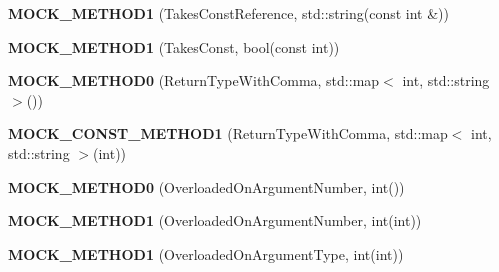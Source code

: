 \begin{DoxyCompactItemize}
{\bfseries M\+O\+C\+K\+\_\+\+M\+E\+T\+H\+O\+D1} (Takes\+Const\+Reference, std\+::string(const int \&))
\item 
\mbox{\label{classtesting_1_1gmock__function__mocker__test_1_1LegacyMockFoo_ab1757ec948df353ac259b0e37752f4c8}} 
{\bfseries M\+O\+C\+K\+\_\+\+M\+E\+T\+H\+O\+D1} (Takes\+Const, bool(const int))
\item 
\mbox{\label{classtesting_1_1gmock__function__mocker__test_1_1LegacyMockFoo_a9173d8a2a77921ea32a74d27ef425a8f}} 
{\bfseries M\+O\+C\+K\+\_\+\+M\+E\+T\+H\+O\+D0} (Return\+Type\+With\+Comma, std\+::map$<$ int, std\+::string $>$())
\item 
\mbox{\label{classtesting_1_1gmock__function__mocker__test_1_1LegacyMockFoo_acc5444194616f279908cc27fc1ad3042}} 
{\bfseries M\+O\+C\+K\+\_\+\+C\+O\+N\+S\+T\+\_\+\+M\+E\+T\+H\+O\+D1} (Return\+Type\+With\+Comma, std\+::map$<$ int, std\+::string $>$(int))
\item 
\mbox{\label{classtesting_1_1gmock__function__mocker__test_1_1LegacyMockFoo_a95b6830083d3a570edb2c6724bb9b49e}} 
{\bfseries M\+O\+C\+K\+\_\+\+M\+E\+T\+H\+O\+D0} (Overloaded\+On\+Argument\+Number, int())
\item 
\mbox{\label{classtesting_1_1gmock__function__mocker__test_1_1LegacyMockFoo_a58bcbf28f96a9c25d7255607ce3502bf}} 
{\bfseries M\+O\+C\+K\+\_\+\+M\+E\+T\+H\+O\+D1} (Overloaded\+On\+Argument\+Number, int(int))
\item 
\mbox{\label{classtesting_1_1gmock__function__mocker__test_1_1LegacyMockFoo_abdbf3c510a10b237f885db1d6f27366b}} 
{\bfseries M\+O\+C\+K\+\_\+\+M\+E\+T\+H\+O\+D1} (Overloaded\+On\+Argument\+Type, int(int))
\item 
\mbox{\label{classtesting_1_1gmock__function__mocker__test_1_1LegacyMockFoo_a64402cd309aa4edf585974199fa1129e}} 

\end{DoxyCompactItemize}
